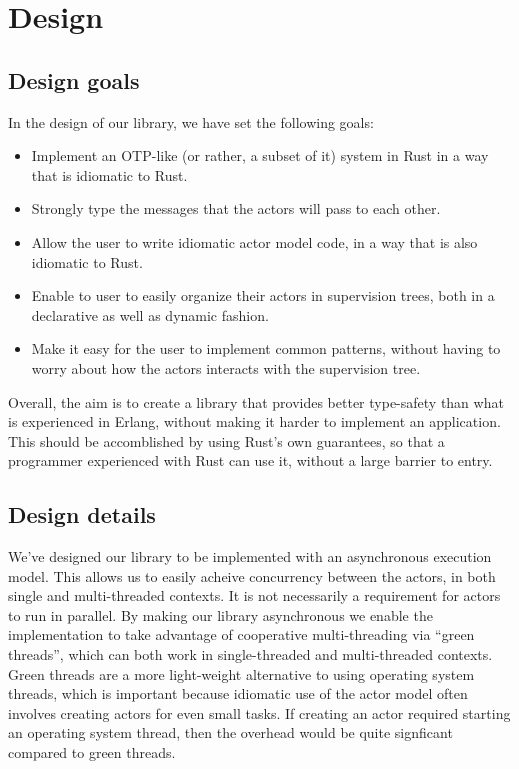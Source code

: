 \documentclass[a4paper]{article}
\begin{document}
\section{Design}
\subsection{Design goals}
In the design of our library, we have set the following goals:
\begin{itemize}
\item Implement an OTP-like (or rather, a subset of it) system in Rust in a way
  that is idiomatic to Rust.
\item Strongly type the messages that the actors will pass to each other.
\item Allow the user to write idiomatic actor model code, in a way that is also
  idiomatic to Rust.
\item Enable to user to easily organize their actors in supervision trees, both
  in a declarative as well as dynamic fashion.
\item Make it easy for the user to implement common patterns, without having to
  worry about how the actors interacts with the supervision tree.
\end{itemize}

\noindent
Overall, the aim is to create a library that provides better type-safety than
what is experienced in Erlang, without making it harder to implement an
application. This should be accomblished by using Rust's own guarantees, so that
a programmer experienced with Rust can use it, without a large barrier to entry.

\subsection{Design details}
We've designed our library to be implemented with an asynchronous execution
model. This allows us to easily acheive concurrency between the actors, in both
single and multi-threaded contexts. It is not necessarily a requirement for
actors to run in parallel. By making our library asynchronous we enable the
implementation to take advantage of cooperative multi-threading via ``green
threads'', which can both work in single-threaded and multi-threaded contexts.
Green threads are a more light-weight alternative to using operating system
threads, which is important because idiomatic use of the actor model often
involves creating actors for even small tasks. If creating an actor required
starting an operating system thread, then the overhead would be quite signficant
compared to green threads.\\
\end{document}
